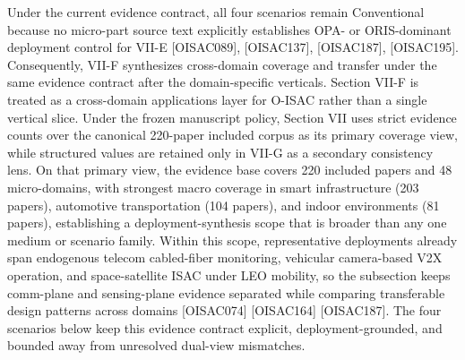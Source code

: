 \markdownRendererUlItem Under the current evidence contract, all four scenarios remain Conventional because no micro-part source text explicitly establishes OPA- or ORIS-dominant deployment control for VII-E [O\markdownRendererUnderscore{}ISAC\markdownRendererUnderscore{}089], [O\markdownRendererUnderscore{}ISAC\markdownRendererUnderscore{}137], [O\markdownRendererUnderscore{}ISAC\markdownRendererUnderscore{}187], [O\markdownRendererUnderscore{}ISAC\markdownRendererUnderscore{}195].\markdownRendererUlItemEnd 
\markdownRendererUlEndTight \markdownRendererInterblockSeparator
{}Consequently, VII-F synthesizes cross-domain coverage and transfer under the same evidence contract after the domain-specific verticals.\markdownRendererInterblockSeparator
{}
\markdownRendererSectionEnd 
\markdownRendererSectionEnd \markdownRendererSectionBegin
{}\markdownRendererInterblockSeparator
{}\markdownRendererSectionBegin
{}\markdownRendererInterblockSeparator
{}Section VII-F is treated as a cross-domain applications layer for O-ISAC rather than a single vertical slice. Under the frozen manuscript policy, Section VII uses strict evidence counts over the canonical 220-paper included corpus as its primary coverage view, while structured  values are retained only in VII-G as a secondary consistency lens. On that primary view, the evidence base covers 220 included papers and 48 micro-domains, with strongest macro coverage in smart infrastructure (203 papers), automotive transportation (104 papers), and indoor environments (81 papers), establishing a deployment-synthesis scope that is broader than any one medium or scenario family. Within this scope, representative deployments already span endogenous telecom cabled-fiber monitoring, vehicular camera-based V2X operation, and space-satellite ISAC under LEO mobility, so the subsection keeps comm-plane and sensing-plane evidence separated while comparing transferable design patterns across domains [O\markdownRendererUnderscore{}ISAC\markdownRendererUnderscore{}074] [O\markdownRendererUnderscore{}ISAC\markdownRendererUnderscore{}164] [O\markdownRendererUnderscore{}ISAC\markdownRendererUnderscore{}187]. The four scenarios below keep this evidence contract explicit, deployment-grounded, and bounded away from unresolved dual-view mismatches.\markdownRendererInterblockSeparator
{}
\markdownRendererSectionEnd \markdownRendererSectionBegin
